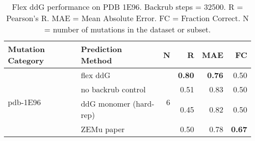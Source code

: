 \begin{table}
  \begin{tabular}{llrrrr}
\toprule
Mutation Category &       Prediction Method &  N &    R &  MAE &   FC \\
\midrule
 \multirow{ 4}{*}{pdb-1E96} & flex ddG & \multirow{ 4}{*}{6} & \textbf{0.80} & \textbf{0.76} & 0.50  \\
 & no backrub control & & 0.51 & 0.83 & 0.50  \\
 & ddG monomer (hard-rep) & & 0.45 & 0.82 & 0.50  \\
 & ZEMu paper & & 0.50 & 0.78 & \textbf{0.67}  \\
\bottomrule
\end{tabular}
  \caption[Flex ddG performance on PDB 1E96]{
    Flex ddG performance on PDB 1E96. Backrub steps = 32500. R = Pearson's R. MAE = Mean Absolute Error. FC = Fraction Correct. N = number of mutations in the dataset or subset.
  } \label{tab:table-pdb-1E96}
\end{table}

